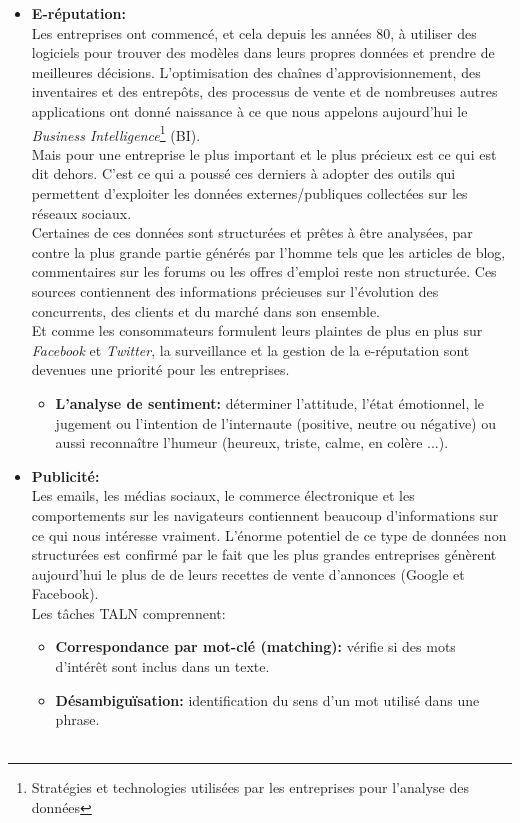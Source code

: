 \begin{itemize}
    \item \textbf{E-réputation:}\\
    Les entreprises ont commencé, et cela depuis les années 80, à utiliser des logiciels pour trouver des modèles dans leurs propres données et prendre de meilleures décisions. L'optimisation des chaînes d'approvisionnement, des inventaires et des entrepôts, des processus de vente et de nombreuses autres applications ont donné naissance à ce que nous appelons aujourd'hui le \emph{Business Intelligence}\footnote{Stratégies et technologies utilisées par les entreprises pour l'analyse des données} (BI).\\ 
    Mais pour une entreprise le plus important et le plus précieux est ce qui est dit dehors. C'est ce qui a poussé ces derniers à adopter des outils qui permettent d'exploiter les données externes/publiques collectées sur les réseaux sociaux.\\
    Certaines de ces données sont structurées et prêtes à être analysées, par contre la plus grande partie générés par l'homme tels que les articles de blog, commentaires sur les forums ou les offres d'emploi reste non structurée. Ces sources contiennent des informations précieuses sur l'évolution des concurrents, des clients et du marché dans son ensemble.\\
    Et comme les consommateurs formulent leurs plaintes de plus en plus sur \emph{Facebook} et \emph{Twitter}, la surveillance et la gestion de la e-réputation sont devenues une priorité pour les entreprises.
    \begin{itemize}
        \item \textbf{L'analyse de sentiment:} déterminer l'attitude, l'état émotionnel, le jugement ou l'intention de l'internaute (positive, neutre ou négative) ou aussi reconnaître l'humeur (heureux, triste, calme, en colère ...).\\
    \end{itemize}

    \item \textbf{Publicité:}\\
    Les emails, les médias sociaux, le commerce électronique et les comportements sur les navigateurs contiennent beaucoup d'informations sur ce qui nous intéresse vraiment. L'énorme potentiel de ce type de données non structurées est confirmé par le fait que les plus grandes entreprises génèrent aujourd'hui le plus de de leurs recettes de vente d'annonces (Google et Facebook).\\ Les tâches TALN comprennent:
    \begin{itemize}
        \item \textbf{Correspondance par mot-clé (matching):} vérifie si des mots d'intérêt sont inclus dans un texte. 
        \item \textbf{Désambiguïsation:} identification du sens d'un mot utilisé dans une phrase.\\\\
    \end{itemize}
\end{itemize}


